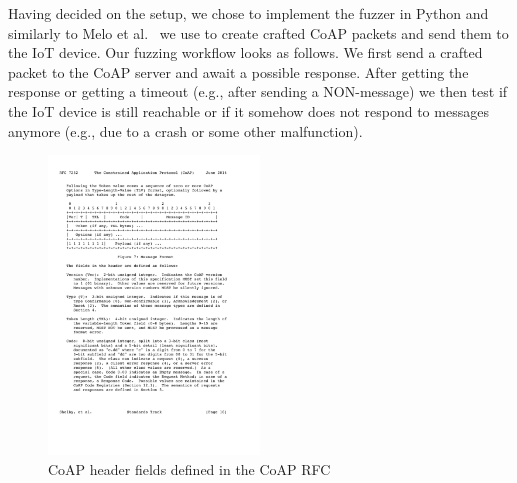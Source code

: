 Having decided on the setup, we chose to implement the fuzzer in Python and similarly to Melo et al.~\cite{Melo2017RobustnessTO} we use \scapy to create crafted CoAP packets and send them to the IoT device. Our fuzzing workflow looks as follows. We first send a crafted packet to the CoAP server and await a possible response. After getting the response or getting a timeout (e.g., after sending a NON-message) we then test if the IoT device is still reachable or if it somehow does not respond to messages anymore (e.g., due to a crash or some other malfunction). 

\begin{figure}[h]
	\centering		
	\includegraphics[width=0.5\textwidth]{images/coap_message_format}
	\caption{CoAP header fields defined in the CoAP RFC~\cite{RFC7252}}
	\label{figure:coap_header}
\end{figure}

